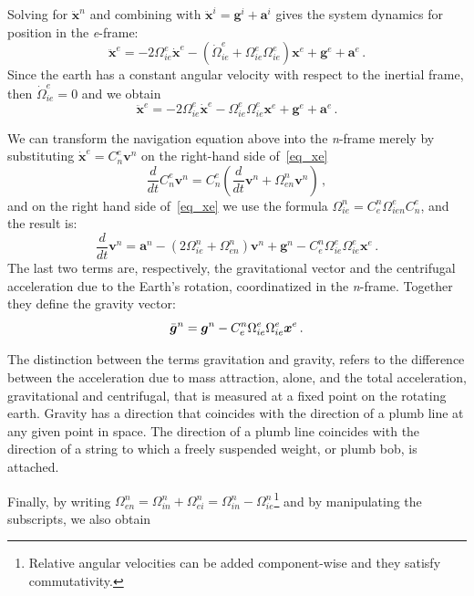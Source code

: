 \documentclass[journal]{IEEEtran}
\begin{document}
Solving for ${\ddot{\boldsymbol{x}}}^{n}$ and combining with ${\ddot{\boldsymbol{x}}}^{i}= {\boldsymbol{g}}^{i}+{\boldsymbol{a}}^{i}$ gives the system dynamics for position in the \textit{e}-frame:
\begin{equation}
        {\ddot{\boldsymbol{x}}}^{e}= -2{\Omega}_{ie}^{e}{\dot{\boldsymbol{x}}}^{e} - ({\dot{\Omega}}_{ie}^{e}+{\Omega}_{ie}^{e}{\Omega}_{ie}^{e}){\boldsymbol{x}}^{e}+{\boldsymbol{g}}^{e}+{\boldsymbol{\boldsymbol{a}}}^{e}\,.
  \end{equation}
Since the earth has a constant angular velocity with respect to the inertial frame, then ${\dot{\Omega}}_{ie}^{e}=0$ and we obtain
\begin{equation}\label{eq_xe}
        {\ddot{\boldsymbol{x}}}^{e}= -2{\Omega}_{ie}^{e}{\dot{\boldsymbol{x}}}^{e} - {\Omega}_{ie}^{e}{\Omega}_{ie}^{e}{\boldsymbol{x}}^{e}+{\boldsymbol{g}}^{e}+{\boldsymbol{\boldsymbol{a}}}^{e}\,.
\end{equation}

We can transform the navigation equation above into the \textit{n}-frame  merely by substituting  ${\dot{\boldsymbol{x}}}^{e} = {C}_{n}^{e}{\boldsymbol{v}}^n$ on the right-hand side of~\eqref{eq_xe}
\begin{equation}
    \frac{d}{dt}C_{n}^{e}\boldsymbol{v}^n = C_{n}^{e}(\frac{d}{dt}\boldsymbol{v}^n+{\Omega}_{en}^{n}\boldsymbol{v}^{n})\,,
\end{equation}
and on the right hand side of~\eqref{eq_xe} we use the formula ${\Omega}_{ie}^{n}=C_{e}^{n}{\Omega}_{ien}^{e}C_{n}^{e}$, and the result is:
\begin{equation}\label{eq_rtyyy}
    \frac{d}{dt}\boldsymbol{v}^n=\boldsymbol{{a}}^{n}- (2{{\Omega}}_{ie}^{n}+{\Omega}_{en}^{n}){\boldsymbol{v}}^{n}+\boldsymbol{{g}}^{n} -C_{e}^{n}{\Omega}_{ie}^{e}{\Omega}_{ie}^{e}\boldsymbol{x}^{e}\,.
\end{equation}
The last two terms are, respectively, the gravitational vector and the centrifugal acceleration due to the Earth's rotation, coordinatized in the \textit{n}-frame. Together they define the gravity vector:
\begin{equation}
   {\Bar{\boldsymbol{g}}}^{n} =\boldsymbol{{g}}^{n} -C_{e}^{n}{\Omega}_{ie}^{e}{\Omega}_{ie}^{e}\boldsymbol{x}^{e}\,.
    \label{eq_nframe_dyn}
\end{equation}

The distinction between the terms gravitation and gravity, refers to the difference between the acceleration due to mass attraction, alone, and the total acceleration, gravitational and centrifugal, that is measured at a fixed point on the rotating earth. Gravity has a direction  that coincides with the direction of a plumb line  at any given point in space. The direction of a plumb line coincides with the direction of a string to which a freely suspended weight, or plumb bob, is attached.\par
Finally, by writing ${\Omega}_{en}^{n}={\Omega}_{in}^{n}+{\Omega}_{ei}^{n}={\Omega}_{in}^{n}-{\Omega}_{ie}^{n}$\footnote{Relative angular velocities can be added component-wise and they satisfy commutativity.} and by manipulating the subscripts, we also obtain
\end{document}
